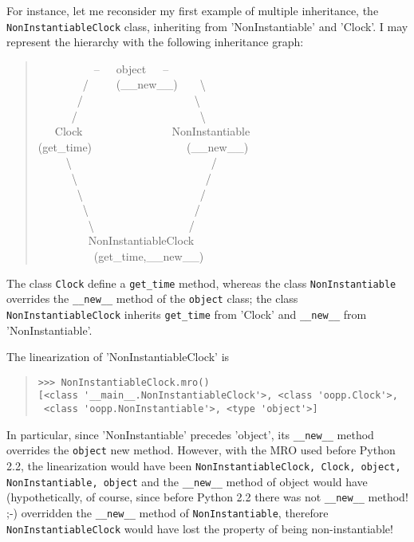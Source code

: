 \documentclass[10pt,english]{article}
\begin{document}
For instance, let me reconsider my first example of multiple inheritance,
the \texttt{NonInstantiableClock} class, inheriting from 'NonInstantiable' and 
'Clock'. I may represent the hierarchy with the following inheritance graph:
\begin{quote}
\begin{ttfamily}\begin{flushleft}
\mbox{~~~~~~~~~~--~~~object~~~--~}\\
\mbox{~~~~~~~~/~~~~~({\_}{\_}new{\_}{\_})~~~~{\textbackslash}}\\
\mbox{~~~~~~~/~~~~~~~~~~~~~~~~~~~~{\textbackslash}}\\
\mbox{~~~~~~/~~~~~~~~~~~~~~~~~~~~~~{\textbackslash}}\\
\mbox{~~~Clock~~~~~~~~~~~~~~~~NonInstantiable}\\
\mbox{(get{\_}time)~~~~~~~~~~~~~~~~~({\_}{\_}new{\_}{\_})}\\
\mbox{~~~~~{\textbackslash}~~~~~~~~~~~~~~~~~~~~~~~~~/}\\
\mbox{~~~~~~{\textbackslash}~~~~~~~~~~~~~~~~~~~~~~~/}\\
\mbox{~~~~~~~{\textbackslash}~~~~~~~~~~~~~~~~~~~~~/}\\
\mbox{~~~~~~~~{\textbackslash}~~~~~~~~~~~~~~~~~~~/}\\
\mbox{~~~~~~~~~{\textbackslash}~~~~~~~~~~~~~~~~~/}\\
\mbox{~~~~~~~~~NonInstantiableClock~~~}\\
\mbox{~~~~~~~~~~(get{\_}time,{\_}{\_}new{\_}{\_})}
\end{flushleft}\end{ttfamily}
\end{quote}

The class \texttt{Clock} define a \texttt{get{\_}time} method, whereas the class 
\texttt{NonInstantiable} overrides the \texttt{{\_}{\_}new{\_}{\_}} method of the \texttt{object} class; 
the class \texttt{NonInstantiableClock} inherits \texttt{get{\_}time} from 'Clock' and 
\texttt{{\_}{\_}new{\_}{\_}} from 'NonInstantiable'.

The linearization of 'NonInstantiableClock' is
\begin{quote}
\begin{verbatim}>>> NonInstantiableClock.mro()
[<class '__main__.NonInstantiableClock'>, <class 'oopp.Clock'>, 
 <class 'oopp.NonInstantiable'>, <type 'object'>]\end{verbatim}
\end{quote}

In particular, since 'NonInstantiable' precedes 'object', its \texttt{{\_}{\_}new{\_}{\_}} 
method overrides the \texttt{object} new method. However, with the MRO used before
Python 2.2, the linearization would have been \texttt{NonInstantiableClock, Clock, 
object, NonInstantiable, object} and the \texttt{{\_}{\_}new{\_}{\_}} method of object would 
have (hypothetically, of course, since before Python 2.2 there was not 
\texttt{{\_}{\_}new{\_}{\_}} method! ;-)  overridden the \texttt{{\_}{\_}new{\_}{\_}}
method of \texttt{NonInstantiable}, therefore \texttt{NonInstantiableClock} would 
have lost the property of being non-instantiable!
\end{document}
